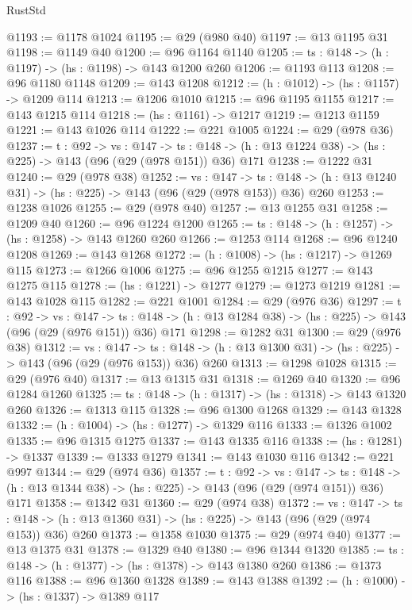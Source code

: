 \begin{lexlean}{RustStd}
\begin{coremodule}
{\begin{coremodule}
{{{{{@1193 := @1178 @1024
@1195 := @29 (@980 @40)
@1197 := @13 @1195 @31
@1198 := @1149 @40
@1200 := @96 @1164 @1140
@1205 := {ts : @148} -> (h : @1197) -> (hs : @1198) -> @143 @1200 @260
@1206 := @1193 @113
@1208 := @96 @1180 @1148
@1209 := @143 @1208
@1212 := (h : @1012) -> (hs : @1157) -> @1209 @114
@1213 := @1206 @1010
@1215 := @96 @1195 @1155
@1217 := @143 @1215 @114
@1218 := (hs : @1161) -> @1217
@1219 := @1213 @1159
@1221 := @143 @1026 @114
@1222 := @221 @1005
@1224 := @29 (@978 @36)
@1237 := {t : @92} ->
  {vs : @147} ->
  {ts : @148} -> (h : @13 @1224 @38) -> (hs : @225) -> @143 (@96 (@29 (@978 @151)) @36) @171
@1238 := @1222 @31
@1240 := @29 (@978 @38)
@1252 := {vs : @147} ->
  {ts : @148} -> (h : @13 @1240 @31) -> (hs : @225) -> @143 (@96 (@29 (@978 @153)) @36) @260
@1253 := @1238 @1026
@1255 := @29 (@978 @40)
@1257 := @13 @1255 @31
@1258 := @1209 @40
@1260 := @96 @1224 @1200
@1265 := {ts : @148} -> (h : @1257) -> (hs : @1258) -> @143 @1260 @260
@1266 := @1253 @114
@1268 := @96 @1240 @1208
@1269 := @143 @1268
@1272 := (h : @1008) -> (hs : @1217) -> @1269 @115
@1273 := @1266 @1006
@1275 := @96 @1255 @1215
@1277 := @143 @1275 @115
@1278 := (hs : @1221) -> @1277
@1279 := @1273 @1219
@1281 := @143 @1028 @115
@1282 := @221 @1001
@1284 := @29 (@976 @36)
@1297 := {t : @92} ->
  {vs : @147} ->
  {ts : @148} -> (h : @13 @1284 @38) -> (hs : @225) -> @143 (@96 (@29 (@976 @151)) @36) @171
@1298 := @1282 @31
@1300 := @29 (@976 @38)
@1312 := {vs : @147} ->
  {ts : @148} -> (h : @13 @1300 @31) -> (hs : @225) -> @143 (@96 (@29 (@976 @153)) @36) @260
@1313 := @1298 @1028
@1315 := @29 (@976 @40)
@1317 := @13 @1315 @31
@1318 := @1269 @40
@1320 := @96 @1284 @1260
@1325 := {ts : @148} -> (h : @1317) -> (hs : @1318) -> @143 @1320 @260
@1326 := @1313 @115
@1328 := @96 @1300 @1268
@1329 := @143 @1328
@1332 := (h : @1004) -> (hs : @1277) -> @1329 @116
@1333 := @1326 @1002
@1335 := @96 @1315 @1275
@1337 := @143 @1335 @116
@1338 := (hs : @1281) -> @1337
@1339 := @1333 @1279
@1341 := @143 @1030 @116
@1342 := @221 @997
@1344 := @29 (@974 @36)
@1357 := {t : @92} ->
  {vs : @147} ->
  {ts : @148} -> (h : @13 @1344 @38) -> (hs : @225) -> @143 (@96 (@29 (@974 @151)) @36) @171
@1358 := @1342 @31
@1360 := @29 (@974 @38)
@1372 := {vs : @147} ->
  {ts : @148} -> (h : @13 @1360 @31) -> (hs : @225) -> @143 (@96 (@29 (@974 @153)) @36) @260
@1373 := @1358 @1030
@1375 := @29 (@974 @40)
@1377 := @13 @1375 @31
@1378 := @1329 @40
@1380 := @96 @1344 @1320
@1385 := {ts : @148} -> (h : @1377) -> (hs : @1378) -> @143 @1380 @260
@1386 := @1373 @116
@1388 := @96 @1360 @1328
@1389 := @143 @1388
@1392 := (h : @1000) -> (hs : @1337) -> @1389 @117
}}}}}
\end{coremodule}}
\end{coremodule}
\end{lexlean}
